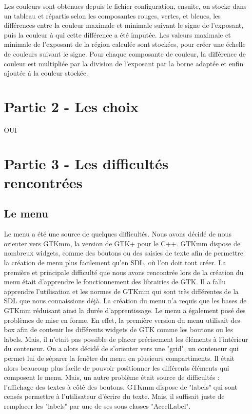 \documentclass{article}
\begin{document}
Les couleurs sont obtenues depuis le fichier configuration, ensuite, on stocke dans un tableau et répartis selon les composantes rouges, vertes, et bleues, les différences entre la couleur maximale et minimale suivant le signe de l'exposant, puis la couleur à qui cette différence a été imputée.
Les valeurs maximale et minimale de l'exposant de la région  calculée sont stockées, pour créer une échelle de couleurs suivant le signe.
Pour chaque composante de couleur, la différence de couleur est multipliée par la division de l'exposant par la borne adaptée et enfin ajoutée à la couleur stockée.

\section* {Partie 2 - Les choix}
OUI

\section* {Partie 3 - Les difficultés rencontrées}
\subsection*{Le menu}
Le menu a été une source de quelques difficultés.
Nous avons décidé de nous orienter vers GTKmm, la version de GTK+ pour le C++.
GTKmm dispose de nombreux widgets, comme des boutons ou des saisies de texte afin de permettre la création de menu plus facilement qu'en SDL, où l'on doit tout créer.
La première et principale difficulté que nous avons rencontrée lors de la création du menu était d'apprendre le fonctionnement des librairies de GTK. Il a fallu apprendre l'utilisation et les normes de GTKmm qui sont très différentes de la SDL que nous connaissions déjà.
La création du menu n'a requis que les bases de GTKmm réduisant ainsi la durée d'apprentissage.
Le menu a également posé des problèmes de mise en forme.
En effet, la première version du menu utilisait des box afin de contenir les différents widgets de GTK comme les boutons ou les labels.
Mais, il n'etait pas possible de placer précisement les éléments à l'intérieur du conteneur.
On a alors décidé de s'orienter vers une "grid", un conteneur qui permet lui de séparer la fenêtre du menu en plusieurs compartiments.
Il était alors beaucoup plus facile de pouvoir positionner les différents éléments qui composent le menu.
Mais, un autre problème était source de difficultés : l'affichage des textes à côté des boutons.
GTKmm dispose de "labels" qui sont censés permettre à l'utilisateur d'écrire du texte.
Mais, il suffisait juste de remplacer les "labels" par une de ses sous classes "AccelLabel".
\end{document}
